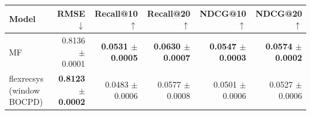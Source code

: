 \begin{tabular}{lrrrrr}
\toprule
Model & RMSE $\downarrow$ & Recall@10 $\uparrow$ & Recall@20 $\uparrow$ & NDCG@10 $\uparrow$ & NDCG@20 $\uparrow$ \\
\midrule
MF & 0.8136 $\pm$ 0.0001 & \textbf{0.0531 $\pm$ 0.0005} & \textbf{0.0630 $\pm$ 0.0007} & \textbf{0.0547 $\pm$ 0.0003} & \textbf{0.0574 $\pm$ 0.0002} \\
flexrecsys (window BOCPD) & \textbf{0.8123 $\pm$ 0.0002} & 0.0483 $\pm$ 0.0006 & 0.0577 $\pm$ 0.0008 & 0.0501 $\pm$ 0.0006 & 0.0527 $\pm$ 0.0006 \\
\bottomrule
\end{tabular}
